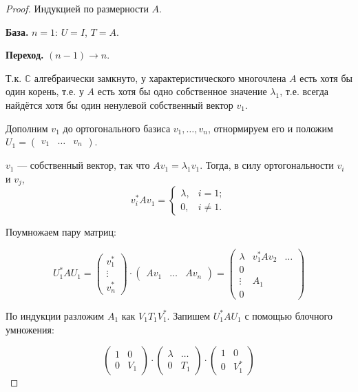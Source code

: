 \documentclass[a4paper, 12pt]{article}
\newenvironment{base}{\par\noindent\textbf{База.}}{\hfill}
\newenvironment{induct}{\par\noindent\textbf{Переход.}}{\hfill}
\newcommand{\CC}{\mathbb{C}}
\begin{document}
\begin{proof} Индукцией по размерности $A$.
    \begin{base} $n = 1$: $U = I$, $T = A$. \end{base}
    \begin{induct}
        $(n - 1) \to n$.

        Т.к. $\CC$ алгебраически замкнуто, у характеристического многочлена $A$
        есть хотя бы один корень, т.е. у $A$ есть хотя бы одно собственное
        значение $\lambda_1$, т.е. всегда найдётся хотя бы один ненулевой
        собственный вектор $v_1$.

        Дополним $v_1$ до ортогонального базиса $v_1, \dots , v_n$, отнормируем
        его и положим $U_1 = \begin{pmatrix} v_1 & \dots & v_n \end{pmatrix}$.

        $v_1$ --- собственный вектор, так что $A v_1 = \lambda_1 v_1$. Тогда, в
        силу ортогональности $v_i$ и $v_j$,
        \[
            v_i^* A v_1 = \begin{cases}
                \lambda, & i = 1; \\
                0, & i \ne 1.
            \end{cases}
        \]

        Поумножаем пару
        матриц:

        \[
            U_1^* A U_1 = \begin{pmatrix} v_1^* \\ \vdots \\ v_n^* \end{pmatrix}
            \cdot \begin{pmatrix} A v_1 & \dots & A v_n \end{pmatrix}
            = \begin{pmatrix}
                \lambda & v_1^* A v_2 & \dots \\
                0 \\
                \vdots & A_1 \\
                0
            \end{pmatrix}
        \]

        По индукции разложим $A_1$ как $V_1 T_1 V_1^*$. Запишем $U_1^* A U_1$ с
        помощью блочного умножения:

        \[
            \begin{pmatrix} 1 & 0 \\ 0 & V_1 \end{pmatrix}
            \cdot \begin{pmatrix} \lambda & \dots \\ 0 & T_1 \end{pmatrix}
            \cdot \begin{pmatrix} 1 & 0 \\ 0 & V_1^* \end{pmatrix}
        \]


\end{induct}
\end{proof}
\end{document}
